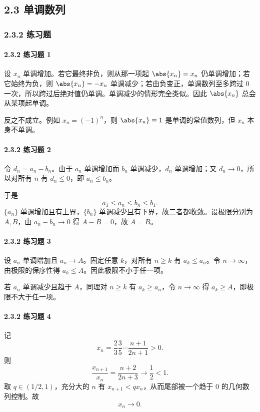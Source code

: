 \subsection*{2.3 单调数列}

\subsubsection*{2.3.2 练习题}

\paragraph{2.3.2 练习题 1}
\begin{xsolution}
设 $x_n$ 单调增加。若它最终非负，则从那一项起 $\abs{x_n}=x_n$ 仍单调增加；若它始终为负，则 $\abs{x_n}=-x_n$ 单调减少；若由负变正，单调数列至多跨过 $0$ 一次，所以跨过后绝对值仍单调。单调减少的情形完全类似。因此 $\abs{x_n}$ 总会从某项起单调。

反之不成立。例如 $x_n=(-1)^n$，则 $\abs{x_n}\equiv1$ 是单调的常值数列，但 $x_n$ 本身不单调。
\end{xsolution}

\paragraph{2.3.2 练习题 2}
\begin{xsolution}
令 $d_n=a_n-b_n$。由于 $a_n$ 单调增加而 $b_n$ 单调减少，$d_n$ 单调增加；又 $d_n\to0$，所以对所有 $n$ 有 $d_n\le0$，即 $a_n\le b_n$。

于是
\[
  a_1\le a_n\le b_n\le b_1.
\]
$\{a_n\}$ 单调增加且有上界，$\{b_n\}$ 单调减少且有下界，故二者都收敛。设极限分别为 $A,B$，由 $a_n-b_n\to0$ 得 $A-B=0$，故 $A=B$。
\end{xsolution}

\paragraph{2.3.2 练习题 3}
\begin{xsolution}
设 $a_n$ 单调增加且 $a_n\to A$。固定任意 $k$，对所有 $n\ge k$ 有 $a_k\le a_n$。令 $n\to\infty$，由极限的保序性得 $a_k\le A$。因此极限不小于任一项。

若 $a_n$ 单调减少且趋于 $A$，同理对 $n\ge k$ 有 $a_k\ge a_n$，令 $n\to\infty$ 得 $a_k\ge A$，即极限不大于任一项。
\end{xsolution}

\paragraph{2.3.2 练习题 4}
\begin{xsolution}
记
\[
  x_n=\frac23\frac35\cdots\frac{n+1}{2n+1}>0.
\]
则
\[
  \frac{x_{n+1}}{x_n}=\frac{n+2}{2n+3}\to\frac12<1.
\]
取 $q\in(1/2,1)$，充分大的 $n$ 有 $x_{n+1}<q x_n$，从而尾部被一个趋于 $0$ 的几何数列控制。故
\[
  \boxed{x_n\to0}.
\]
\end{xsolution}

